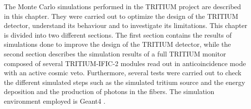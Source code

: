 The Monte Carlo simulations performed in the TRITIUM project are described in this chapter. They were carried out to optimize the design of the TRITIUM detector, understand its behaviour and to investigate its limitations. This chapter is divided into two different sections. The first section contains the results of simulations done to improve the design of the TRITIUM detector, while the second section describes the simulation results of a full TRITIUM monitor composed of several TRITIUM-IFIC-2 modules read out in anticoincidence mode with an active cosmic veto. Furthermore, several tests were carried out to check the different simulated steps such as the simulated tritium source and the energy deposition and the production of photons in the fibers. The simulation environment employed is Geant4 \cite{Geant4WebPage, Geant4P}.